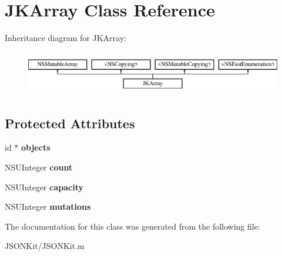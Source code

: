 \hypertarget{interface_j_k_array}{\section{J\+K\+Array Class Reference}
\label{interface_j_k_array}
}
Inheritance diagram for J\+K\+Array\+:\begin{figure}[H]
\begin{center}
\leavevmode
\includegraphics[height=1.931034cm]{interface_j_k_array}
\end{center}
\end{figure}
\subsection*{Protected Attributes}
\begin{DoxyCompactItemize}
\item 
\hypertarget{interface_j_k_array_a26bec99d019d3ec883d849986e2c3ef9}{id $\ast$ {\bfseries objects}}\label{interface_j_k_array_a26bec99d019d3ec883d849986e2c3ef9}

\item 
\hypertarget{interface_j_k_array_a903336bb8564dd3b732b4a0aab7dfb48}{N\+S\+U\+Integer {\bfseries count}}\label{interface_j_k_array_a903336bb8564dd3b732b4a0aab7dfb48}

\item 
\hypertarget{interface_j_k_array_a74b14ae533a3004ac5eef33d06c59470}{N\+S\+U\+Integer {\bfseries capacity}}\label{interface_j_k_array_a74b14ae533a3004ac5eef33d06c59470}

\item 
\hypertarget{interface_j_k_array_af5ad2eeccbca0b4203feb674a975aaf4}{N\+S\+U\+Integer {\bfseries mutations}}\label{interface_j_k_array_af5ad2eeccbca0b4203feb674a975aaf4}

\end{DoxyCompactItemize}


The documentation for this class was generated from the following file\+:\begin{DoxyCompactItemize}
\item 
J\+S\+O\+N\+Kit/J\+S\+O\+N\+Kit.\+m\end{DoxyCompactItemize}
